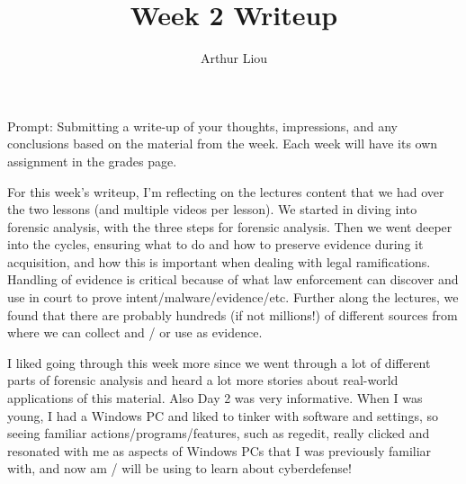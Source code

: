 \documentclass[12pt]{article}
\begin{document}
 
 
\title{Week 2 Writeup}
\author{Arthur Liou}

\maketitle

Prompt: Submitting a write-up of your thoughts, impressions, and any conclusions based on the material from the week. Each week will have its own assignment in the grades page.
\par
\linebreak
For this week’s writeup, I’m reflecting on the lectures content that we had over the two lessons (and multiple videos per lesson). We started in diving into forensic analysis, with the three steps for forensic analysis. Then we went deeper into the cycles, ensuring what to do and how to preserve evidence during it acquisition, and how this is important when dealing with legal ramifications. Handling of evidence is critical because of what law enforcement can discover and use in court to prove intent/malware/evidence/etc. Further along the lectures, we found that there are probably hundreds (if not millions!) of different sources from where we can collect and / or use as evidence.

I liked going through this week more since we went through a lot of different parts of forensic analysis and heard a lot more stories about real-world applications of this material. Also Day 2 was very informative. When I was young, I had a Windows PC and liked to tinker with software and settings, so seeing familiar actions/programs/features, such as regedit, really clicked and resonated with me as aspects of Windows PCs that I was previously familiar with, and now am / will be using to learn about cyberdefense!
\end{document}
